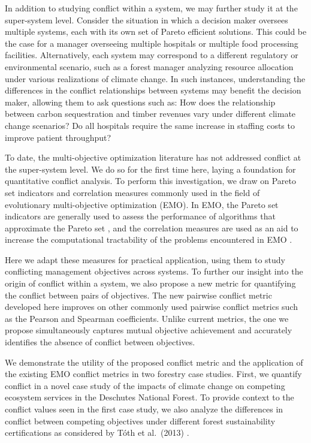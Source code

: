 In addition to studying conflict within a system, we may further study it at the super-system level. Consider the situation in which a decision maker oversees multiple systems, each with its own set of Pareto efficient solutions. This could be the case for a manager overseeing multiple hospitals or multiple food processing facilities. Alternatively, each system may correspond to a different regulatory or environmental scenario, such as a forest manager analyzing resource allocation under various realizations of climate change. In such instances, understanding the differences in the conflict relationships between systems may benefit the decision maker, allowing them to ask questions such as: How does the relationship between carbon sequestration and timber revenues vary under different climate change scenarios? Do all hospitals require the same increase in staffing costs to improve patient throughput?

To date, the multi-objective optimization literature has not addressed conflict at the super-system level. We do so for the first time here, laying a foundation for quantitative conflict analysis. To perform this investigation, we draw on Pareto set indicators and correlation measures commonly used in the field of evolutionary multi-objective optimization (EMO). In EMO, the Pareto set indicators are generally used to assess the performance of algorithms that approximate the Pareto set \cite{zitzler2003performance}, and the correlation measures are used as an aid to increase the computational tractability of the problems encountered in EMO \cite{brockhoff2006all}.

Here we adapt these measures for practical application, using them to study conflicting management objectives across systems. To further our insight into the origin of conflict within a system, we also propose a new metric for quantifying the conflict between pairs of objectives. The new pairwise conflict metric developed here improves on other commonly used pairwise conflict metrics such as the Pearson and Spearman coefficients. Unlike current metrics, the one we propose simultaneously captures mutual objective achievement and accurately identifies the absence of conflict between objectives.

We demonstrate the utility of the proposed conflict metric and the application of the existing EMO conflict metrics in two forestry case studies. First,  we quantify conflict in a novel case study of the impacts of climate change on competing ecosystem services in the Deschutes National Forest. To provide context to the conflict values seen in the first case study, we also analyze the differences in conflict between competing objectives under different forest sustainability certifications as considered by T{\'o}th et al.\ (2013) \cite{toth2013ecosel}.


